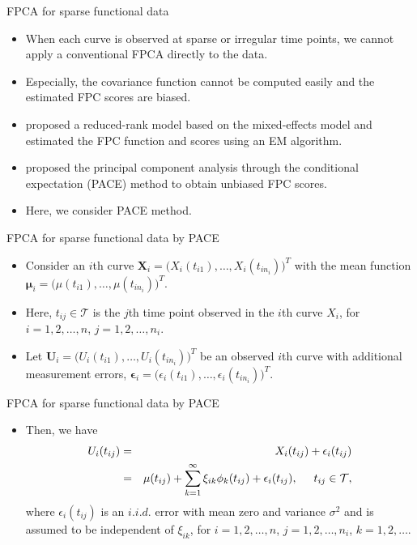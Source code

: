 \documentclass{beamer}
\def \bY { \mathbf{ Y } }
\def \bX { \mathbf{ X } }
\def \bU { \mathbf{ U } }
\def \bmu { \boldsymbol{ \mu } }
\def \bphi { \boldsymbol{ \phi } }
\def \bepsilon { \boldsymbol{ \epsilon } }
\begin{document}
\begin{frame}{FPCA for sparse functional data}
	\begin{itemize}
		\item{
			When each curve is observed at sparse or irregular time points, we cannot apply a conventional FPCA directly to the data.
		}
		\item{
			Especially, the covariance function cannot be computed easily and the estimated FPC scores are biased.
		}
		\item{
			\cite{James2000} proposed a reduced-rank model based on the mixed-effects model and estimated the FPC function and scores using an EM algorithm.
		}
		\item{
			\cite{Yao2005} proposed the principal component analysis through the conditional expectation (PACE) method to obtain unbiased FPC scores.
		}
		\item{
			Here, we consider PACE method.
		}
	\end{itemize}
\end{frame}

\begin{frame}{FPCA for sparse functional data by PACE}
	\begin{itemize}
		\item{
			 Consider an $i$th curve $\bX_i = \big( X_i(t_{i1}), \dots, X_i(t_{in_i}) \big)^T$ with the mean function $\bmu_i = \big( \mu(t_{i1}), \dots, \mu(t_{in_i}) \big)^T$.
		}
		\item{
			Here, $t_{ij} \in \mathcal{T}$ is the $j$th time point observed in the $i$th curve $X_i$, for $i = 1, 2, \dots, n$, $j = 1, 2, \dots, n_i$.
		}
		\item{
			Let $\bU_i = \big( U_i(t_{i1}), \dots, U_i(t_{in_i}) \big)^T$ be an observed $i$th curve with additional measurement errors, $\bepsilon_i = \big( \epsilon_i(t_{i1}), \dots, \epsilon_i(t_{in_i}) \big)^T$.
		}
	\end{itemize}
\end{frame}

\begin{frame}{FPCA for sparse functional data by PACE}
	\begin{itemize}
		\item{
			Then, we have
			\begin{eqnarray*}
				U_i(t_{ij})& =&X_i(t_{ij}) + \epsilon_i(t_{ij})\\
				& =&  \mu(t_{ij}) + \sum_{k=1}^\infty \xi_{ik} \phi_k(t_{ij}) + \epsilon_i(t_{ij}), \hspace{0.5cm} t_{ij} \in \mathcal{T},
			\end{eqnarray*}
			where $\epsilon_i(t_{ij})$ is an $i.i.d.$ error with mean zero and variance $\sigma^2$ and is assumed to be independent of $\xi_{ik}$, for $i = 1, 2, \dots, n$, $j = 1, 2, \dots, n_i$, $k=1, 2, \ldots $.
		}
	\end{itemize}
\end{frame}
\end{document}

